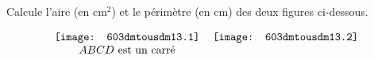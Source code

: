 Calcule l'aire (en cm$^2$) et le périmètre (en cm) des deux figures
ci-dessous.
\par
\[\begin{tabular}{cc}
\texttt{[image: 603dmtousdm13.1]}&
\texttt{[image: 603dmtousdm13.2]}\\
$ABCD$ est un carré&\\
\end{tabular}
\]
